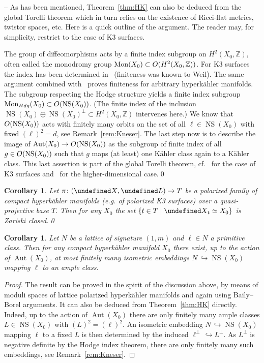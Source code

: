 \documentclass[11pt]{article}
\newtheorem{coro}[theo]{Corollary}
\theoremstyle{definition}
\numberwithin{equation}{section}
\numberwithin{figure}{section}
\numberwithin{table}{section}
\let\cal\undefined
\DeclareMathOperator{\Aut}{Aut}
\DeclareMathOperator{\Mon}{Mon}
\DeclareMathOperator{\NS}{NS}
\newcommand{\OO}{{\rm O}}
\newcommand{\cal}{\mathcal}
\newcommand{\kl}{{\cal L}}
\newcommand{\kx}{{\cal X}}
\newcommand{\ZZ}{\mathbb{Z}}
\renewcommand{\cong}{\simeq}
\begin{document}
-- As has been mentioned, Theorem~\ref{thm:HK} can also be deduced from the global Torelli theorem which in turn relies on the existence of Ricci-flat metrics, twistor spaces, etc. Here is a quick outline of the argument. The reader may, for simplicity, restrict to the case of K3 surfaces.

The group of diffeomorphisms acts by a finite index subgroup on $H^2(X_0,\ZZ)$, often called the monodromy group $\Mon(X_0)\subset \OO(H^2(X_0,\ZZ))$. For K3 surfaces the index has been determined in~\cite{Borcea} (finiteness was known to Weil). The same argument combined with~\cite{HuyFin} proves finiteness for arbitrary hyperk\"ahler manifolds. The subgroup respecting the Hodge structure yields a finite index subgroup $\Mon_{\rm Hdg}(X_0)\subset\OO(\NS(X_0))$. (The finite index of the inclusion $\NS(X_0)\oplus\NS(X_0)^\perp\subset H^2(X_0,\ZZ)$ intervenes here.) We know that $\OO(\NS(X_0))$ acts with finitely many orbits on the set of all $\ell\in\NS(X_0)$ with fixed $(\ell)^2=d$, see Remark~\ref{rem:Kneser}. The last step now is to describe the image of $\Aut(X_0)\to \OO(\NS(X_0))$ as the subgroup of finite index of all $g\in \OO(\NS(X_0))$ such that $g$ maps (at least) one K\"ahler class again to a K\"ahler class. This last assertion is part of the global Torelli theorem, cf.~\cite[Chapter~15]{HuyK3} for the case of K3 surfaces and~\cite{Mar,Verb} for the higher-dimensional case.\qed


\begin{coro}
Let $\pi\colon(\kx,\kl)\to T$ be a polarized family of compact hyperk\"ahler manifolds (e.g. of polarized K3 surfaces) over a quasi-projective base $T$. Then for any $X_0$ the set $\{t\in T\mid \kx_t\cong X_0\}$ is Zariski closed.\qed
\end{coro}

\begin{coro}
Let $N$ be a lattice of signature $(1,m)$ and $\ell\in N$ a primitive class. Then for any compact hyperk\"ahler manifold $X_0$ there exist, up to the action of $\Aut(X_0)$, at most finitely many isometric embeddings $N\,\hookrightarrow \NS(X_0)$ mapping $\ell$ to an ample class.
\end{coro}

\begin{proof}
The result can be proved in the spirit of the discussion above, by means of moduli spaces of lattice polarized hyperk\"ahler manifolds and again using Baily--Borel arguments. It can also be deduced from Theorem~\ref{thm:HK} directly. Indeed, up to the action of $\Aut(X_0)$ there are only finitely many ample classes $L\in\NS(X_0)$ with $(L)^2=(\ell)^2$. An isometric embedding $N\,\hookrightarrow \NS(X_0)$ mapping $\ell$ to a fixed $L$ is then determined by the induced $\ell^\perp\,\hookrightarrow L^\perp$. As $L^\perp$ is negative definite by the Hodge index theorem, there are only finitely many such embeddings, see Remark~\ref{rem:Kneser}.
\end{proof}
\end{document}
